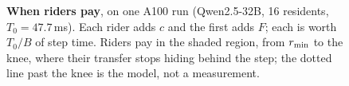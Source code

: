 \begin{figure}[t]
\caption{\textbf{When riders pay}, on one A100 run (Qwen2.5-32B, 16
residents, $T_0 = 47.7$\,ms). Each rider adds $c$ and the first adds $F$; each
is worth $T_0/B$ of step time. Riders pay in the shaded region, from
$r_{\min}$ to the knee, where their transfer stops hiding behind the step; the dotted line past the knee is the model,
not a measurement.}
\label{fig:worth}
\end{figure}
